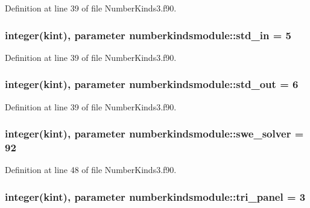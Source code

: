 Definition at line 39 of file Number\+Kinds3.\+f90.

\hypertarget{classnumberkindsmodule_aeee3045e62a09578c8657f47d61bd423}{
\subsubsection[{std\+\_\+in}]{\setlength{\rightskip}{0pt plus 5cm}integer({\bf kint}), parameter numberkindsmodule\+::std\+\_\+in = 5}}\label{classnumberkindsmodule_aeee3045e62a09578c8657f47d61bd423}


Definition at line 39 of file Number\+Kinds3.\+f90.

\hypertarget{classnumberkindsmodule_afde1037e03524a31f4c27989e4651732}{
\subsubsection[{std\+\_\+out}]{\setlength{\rightskip}{0pt plus 5cm}integer({\bf kint}), parameter numberkindsmodule\+::std\+\_\+out = 6}}\label{classnumberkindsmodule_afde1037e03524a31f4c27989e4651732}


Definition at line 39 of file Number\+Kinds3.\+f90.

\hypertarget{classnumberkindsmodule_a4c6e608e5607bcb2090a2e1b3dd482c5}{
\subsubsection[{swe\+\_\+solver}]{\setlength{\rightskip}{0pt plus 5cm}integer({\bf kint}), parameter numberkindsmodule\+::swe\+\_\+solver = 92}}\label{classnumberkindsmodule_a4c6e608e5607bcb2090a2e1b3dd482c5}


Definition at line 48 of file Number\+Kinds3.\+f90.

\hypertarget{classnumberkindsmodule_ac5f366e59a1a142274f1abf9a3895188}{
\subsubsection[{tri\+\_\+panel}]{\setlength{\rightskip}{0pt plus 5cm}integer({\bf kint}), parameter numberkindsmodule\+::tri\+\_\+panel = 3}}\label{classnumberkindsmodule_ac5f366e59a1a142274f1abf9a3895188}


